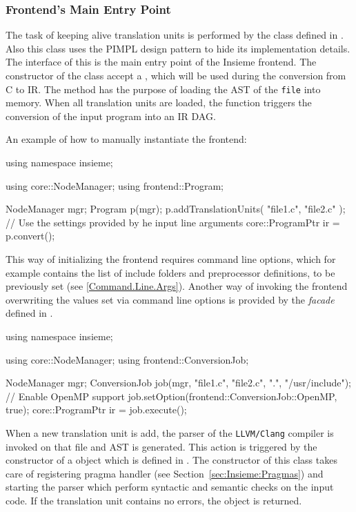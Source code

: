 \subsubsection{Frontend's Main Entry Point}

The task of keeping alive translation units is performed by the
 class defined in . Also this
class uses the PIMPL design pattern to hide its implementation details. The
interface of this is the main entry point of the Insieme frontend. The
constructor of the  class accept a , which
will be used during the conversion from C to IR.  The method
 has the purpose of loading
the AST of the {\tt file} into memory. When all translation units are loaded,
the  function triggers the conversion of the input program into
an IR DAG. 

An example of how to manually instantiate the frontend: 
\begin{srcCode}
using namespace insieme;

using core::NodeManager;
using frontend::Program;

NodeManager mgr;
Program p(mgr);
p.addTranslationUnits( {"file1.c", "file2.c"} );
// Use the settings provided by he input line arguments 
core::ProgramPtr ir = p.convert();
\end{srcCode}

This way of initializing the frontend requires command line options, which for
example contains the list of include folders and preprocessor definitions, to be
previously set (see \ref{Command.Line.Args}). Another way of invoking the
frontend overwriting the values set via command line options is
provided by the  \emph{facade} defined in
.

\begin{srcCode}
using namespace insieme;

using core::NodeManager;
using frontend::ConversionJob;

NodeManager mgr;
ConversionJob job(mgr, {"file1.c", "file2.c"}, {".", "/usr/include"});
// Enable OpenMP support
job.setOption(frontend::ConversionJob::OpenMP, true);
core::ProgramPtr ir = job.execute();
\end{srcCode}

When a new translation unit is add, the parser of the {\tt LLVM/Clang} compiler
is invoked on that file and AST is generated. This action is triggered by the
constructor of a  object which is defined in
. The constructor of this class takes care of
registering pragma handler (see Section~\ref{sec:Insieme:Pragmas}) and starting
the parser which perform syntactic and semantic checks on the input code. If the
translation unit contains no errors, the  object is
returned. 

